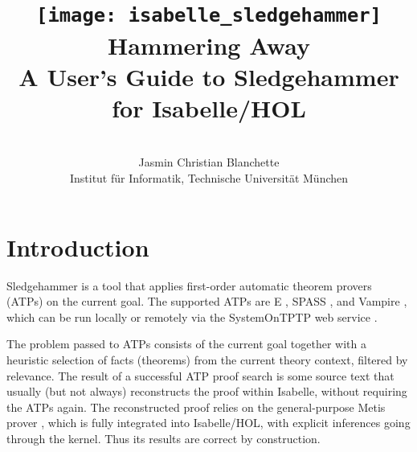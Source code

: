 \documentclass[a4paper,12pt]{article}
\begin{document}

\title{\texttt{[image: isabelle\_sledgehammer]} \\[4ex]
Hammering Away \\[\smallskipamount]
\Large A User's Guide to Sledgehammer for Isabelle/HOL}
\author{\hbox{} \\
Jasmin Christian Blanchette \\
{\normalsize Institut f\"ur Informatik, Technische Universit\"at M\"unchen} \\
\hbox{}}

\maketitle

\tableofcontents

\setlength{\parskip}{.7em plus .2em minus .1em}
\setlength{\parindent}{0pt}
\setlength{\abovedisplayskip}{\parskip}
\setlength{\abovedisplayshortskip}{.9\parskip}
\setlength{\belowdisplayskip}{\parskip}
\setlength{\belowdisplayshortskip}{.9\parskip}

\newenvironment{enum}%
    {\begin{list}{}{%
        \setlength{\topsep}{.1\parskip}%
        \setlength{\partopsep}{.1\parskip}%
        \setlength{\itemsep}{\parskip}%
        \advance\itemsep by-\parsep}}
    {\end{list}}

\def\pre{\begingroup\vskip0pt plus1ex\advance\leftskip by\leftmargin
\advance\rightskip by\leftmargin}
\def\post{\vskip0pt plus1ex\endgroup}

\def\prew{\pre\advance\rightskip by-\leftmargin}
\def\postw{\post}

\section{Introduction}
\label{introduction}

Sledgehammer is a tool that applies first-order automatic theorem provers (ATPs)
on the current goal. The supported ATPs are E \cite{schulz-2002}, SPASS
\cite{weidenbach-et-al-2009}, and Vampire \cite{riazanov-voronkov-2002}, which
can be run locally or remotely via the SystemOnTPTP web service
\cite{sutcliffe-2000}.

The problem passed to ATPs consists of the current goal together with a
heuristic selection of facts (theorems) from the current theory context,
filtered by relevance. The result of a successful ATP proof search is some
source text that usually (but not always) reconstructs the proof within
Isabelle, without requiring the ATPs again. The reconstructed proof relies on
the general-purpose Metis prover \cite{metis}, which is fully integrated into
Isabelle/HOL, with explicit inferences going through the kernel. Thus its
results are correct by construction.
\end{document}
